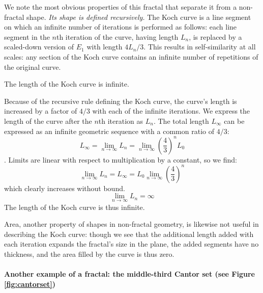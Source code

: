 We note the most obvious properties of this fractal that separate it from a non-fractal shape. 
\textit{Its shape is defined recursively.} The Koch curve is a line segment on which an infinite number of iterations is performed as follows: each line segment in the $n$th iteration of the curve, having length $L_n$, is replaced by a scaled-down version of $E_1$ with length $4L_n/3$. This results in self-similarity at all scales: any section of the Koch curve contains an infinite number of repetitions of the original curve. 

\begin{myproposition} The length of the Koch curve is infinite. \end{myproposition}
\begin{myproof}
Because of the recursive rule defining the Koch curve, the curve's length is increased by a factor of $ 4/3 $ with each of the infinite iterations. We express the length of the curve after the $n$th iteration as $L_n$. The total length $L_\infty$ can be expressed as an infinite geometric sequence with a common ratio of $ 4/3 $:
\begin{equation}
	L_\infty = \lim_{n \to \infty}L_n = \lim_{n \to \infty}\left(\frac{4}{3}\right)^n L_0
\end{equation}.
Limits are linear with respect to multiplication by a constant, so we find:
\begin{equation}
	\lim_{n \to \infty}L_n = L_\infty = L_0 \lim_{n \to \infty} \left(\frac{4}{3}\right)^n
\end{equation}
which clearly increases without bound.
\begin{equation}
	\lim_{n \to \infty}L_n = \infty 
\end{equation}
The length of the Koch curve is thus infinite.
\end{myproof}

Area, another property of shapes in non-fractal geometry, is likewise not useful in describing the Koch curve: though we see that the additional length added with each iteration expands the fractal's size in the plane, the added segments have no thickness, and the area filled by the curve is thus zero.



\paragraph{Another example of a fractal: the middle-third Cantor set (see Figure \ref{fig:cantorset})}

